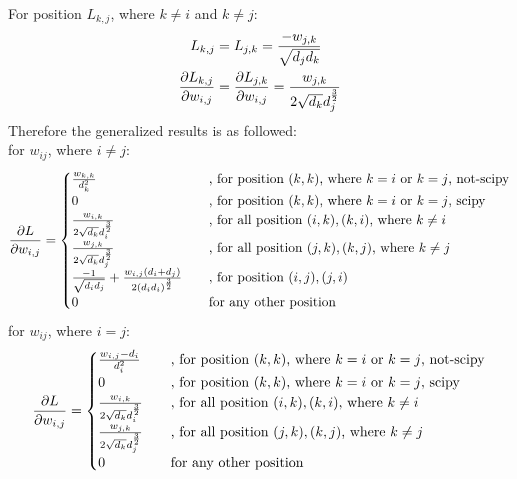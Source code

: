 \documentclass[final]{siamltexmm}
\begin{document}
For position $L_{k,j}$, where $k \neq i$ and $k \neq j$:
\begin{equation}
\begin{aligned}
L_{k,j} &= L_{j,k} =  {-w_{j,k} \over \sqrt{d_jd_k}} \\
{\partial L_{k,j} \over \partial w_{i,j}} &= {\partial L_{j,k} \over \partial w_{i,j}} = {w_{j,k} \over 2\sqrt{d_k}d_j^{3\over2}}
\end{aligned}
\end{equation}
Therefore the generalized results is as followed:\\
for $w_{ij}$, where $i \neq j$:
\begin{equation}
{\partial L \over \partial w_{i,j}} =
\begin{cases}
  {w_{k,k}\over d_k^2}       & \quad \text{, for position $(k,k)$, where $k = i$ or $k = j$, not-scipy}\\
  0       & \quad \text{, for position $(k,k)$, where $k = i$ or $k = j$, scipy}\\
  {w_{i,k} \over 2\sqrt{d_k}d_i^{3\over2}}       & \quad \text{, for all position $(i,k), (k,i)$, where $k \neq i$}\\
  {w_{j,k} \over 2\sqrt{d_k}d_j^{3\over2}}       & \quad \text{, for all position $(j,k), (k,j)$, where $k \neq j$}\\
  {-1 \over \sqrt{d_id_j}} + {w_{i,j}(d_i+d_j) \over 2(d_id_i)^{3\over 2}}       & \quad \text{, for position $(i ,j), (j, i)$}\\
  0 & \quad \text{for any other position} \\
\end{cases}
\end{equation}
for $w_{ij}$, where $i = j$:
\begin{equation}
{\partial L \over \partial w_{i,j}} =
\begin{cases}
  {w_{i,j}-d_i \over d_i^2}       & \quad \text{, for position $(k,k)$, where $k = i$ or $k = j$, not-scipy}\\
  0       & \quad \text{, for position $(k,k)$, where $k = i$ or $k = j$, scipy}\\
  {w_{i,k} \over 2\sqrt{d_k}d_i^{3\over2}}       & \quad \text{, for all position $(i,k), (k,i)$, where $k \neq i$}\\
  {w_{j,k} \over 2\sqrt{d_k}d_j^{3\over2}}       & \quad \text{, for all position $(j,k), (k,j)$, where $k \neq j$}\\
  0 & \quad \text{for any other position} \\
\end{cases}
\end{equation}
\end{document}
